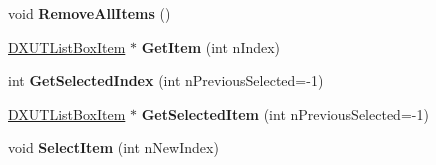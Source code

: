 \begin{DoxyCompactItemize}
\item 
\hypertarget{class_c_d_x_u_t_list_box_ae0391a31359ee6dc8d492da493b1c16d}{void {\bfseries Remove\+All\+Items} ()}\label{class_c_d_x_u_t_list_box_ae0391a31359ee6dc8d492da493b1c16d}

\item 
\hypertarget{class_c_d_x_u_t_list_box_ae438bf19f4954330d4557c41426df1b6}{\hyperlink{struct_d_x_u_t_list_box_item}{D\+X\+U\+T\+List\+Box\+Item} $\ast$ {\bfseries Get\+Item} (int n\+Index)}\label{class_c_d_x_u_t_list_box_ae438bf19f4954330d4557c41426df1b6}

\item 
\hypertarget{class_c_d_x_u_t_list_box_a719db30025631b50017d7f46e70b76b4}{int {\bfseries Get\+Selected\+Index} (int n\+Previous\+Selected=-\/1)}\label{class_c_d_x_u_t_list_box_a719db30025631b50017d7f46e70b76b4}

\item 
\hypertarget{class_c_d_x_u_t_list_box_a35b53b0bd5de2e1dfd0d09c53338f007}{\hyperlink{struct_d_x_u_t_list_box_item}{D\+X\+U\+T\+List\+Box\+Item} $\ast$ {\bfseries Get\+Selected\+Item} (int n\+Previous\+Selected=-\/1)}\label{class_c_d_x_u_t_list_box_a35b53b0bd5de2e1dfd0d09c53338f007}

\item 
\hypertarget{class_c_d_x_u_t_list_box_a9951c0e995690bf7821b70c447d49bed}{void {\bfseries Select\+Item} (int n\+New\+Index)}\label{class_c_d_x_u_t_list_box_a9951c0e995690bf7821b70c447d49bed}

\end{DoxyCompactItemize}
